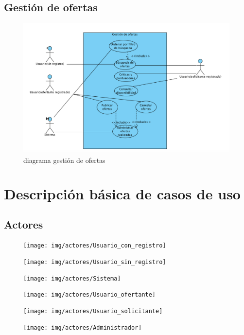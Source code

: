 	\subsection{Gestión de ofertas}
		\begin{figure}[h!]
			\centering
			\includegraphics[width=1.2\linewidth]{Gestion_de_ofertas}
			\caption{diagrama gestión de ofertas}
			\label{fig:gestionofertas}
		\end{figure}
		
\newpage

\section{Descripción básica de casos de uso}
	\subsection{Actores}
	\vspace{-5mm}
	\begin{figure}[h!]
		\centering
		\texttt{[image: img/actores/Usuario\_con\_registro]}
		\label{fig:administrador}
	\end{figure}
	\vspace{-5mm}
	\begin{figure}[h!]
		\centering
		\texttt{[image: img/actores/Usuario\_sin\_registro]}
		\label{fig:administrador}
	\end{figure}
	\begin{figure}[h!]
		\centering
		\texttt{[image: img/actores/Sistema]}
		\label{fig:administrador}
	\end{figure}
	\begin{figure}[h!]
		\centering
		\texttt{[image: img/actores/Usuario\_ofertante]}
		\label{fig:administrador}
	\end{figure}
	\begin{figure}[h!]
		\centering
		\texttt{[image: img/actores/Usuario\_solicitante]}
		\label{fig:administrador}
	\end{figure}
	\begin{figure}[h!]
		\centering
		\texttt{[image: img/actores/Administrador]}
		\label{fig:administrador}
	\end{figure}
	
